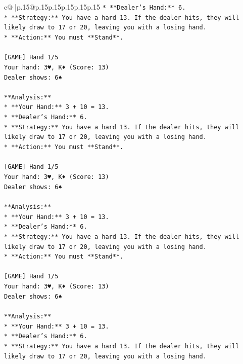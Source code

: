 \documentclass{article}
\begin{document}
{\begin{supertabular}{c@{$\;$}|p{.15\linewidth}@{}p{.15\linewidth}p{.15\linewidth}p{.15\linewidth}p{.15\linewidth}p{.15\linewidth}}
{{{\texttt{*   **Dealer's Hand:** 6.} \\
\texttt{*   **Strategy:** You have a hard 13. If the dealer hits, they will likely draw to 17 or 20, leaving you with a losing hand.} \\
\texttt{*   **Action:** You must **Stand**.} \\
\\ 
\texttt{{[}GAME{]} Hand 1/5} \\
\texttt{Your hand: 3♥, K♦ (Score: 13)} \\
\texttt{Dealer shows: 6♠} \\
\\ 
\texttt{**Analysis:**} \\
\texttt{*   **Your Hand:** 3 + 10 = 13.} \\
\texttt{*   **Dealer's Hand:** 6.} \\
\texttt{*   **Strategy:** You have a hard 13. If the dealer hits, they will likely draw to 17 or 20, leaving you with a losing hand.} \\
\texttt{*   **Action:** You must **Stand**.} \\
\\ 
\texttt{{[}GAME{]} Hand 1/5} \\
\texttt{Your hand: 3♥, K♦ (Score: 13)} \\
\texttt{Dealer shows: 6♠} \\
\\ 
\texttt{**Analysis:**} \\
\texttt{*   **Your Hand:** 3 + 10 = 13.} \\
\texttt{*   **Dealer's Hand:** 6.} \\
\texttt{*   **Strategy:** You have a hard 13. If the dealer hits, they will likely draw to 17 or 20, leaving you with a losing hand.} \\
\texttt{*   **Action:** You must **Stand**.} \\
\\ 
\texttt{{[}GAME{]} Hand 1/5} \\
\texttt{Your hand: 3♥, K♦ (Score: 13)} \\
\texttt{Dealer shows: 6♠} \\
\\ 
\texttt{**Analysis:**} \\
\texttt{*   **Your Hand:** 3 + 10 = 13.} \\
\texttt{*   **Dealer's Hand:** 6.} \\
\texttt{*   **Strategy:** You have a hard 13. If the dealer hits, they will likely draw to 17 or 20, leaving you with a losing hand.} \\
}}}
\end{supertabular}}
\end{document}
